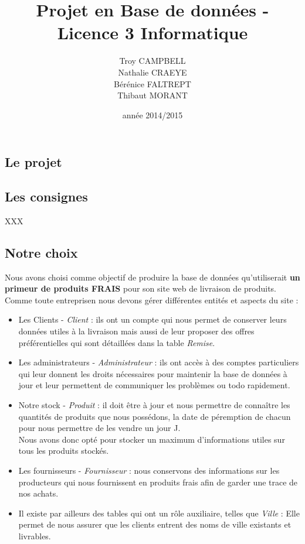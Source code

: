 \documentclass[a4paper, 12pt]{report}
\title{Projet en Base de données - Licence 3 Informatique}
\author{Troy CAMPBELL \\ Nathalie CRAEYE \\ Bérénice FALTREPT \\ Thibaut MORANT}
\date{année 2014/2015}
\begin{document}
    \begin{spacing}{1.2}
\maketitle %


\newpage
\textcolor{colortitre1}{\section*{Le projet}} 

\textcolor{colortitre2}{\subsection*{Les consignes}} 
XXX

\textcolor{colortitre2}{\subsection*{Notre choix}} 
Nous avons choisi comme objectif de produire la base de données qu'utiliserait \textbf{un primeur de produits FRAIS} pour son site web de livraison de produits. Comme toute entreprisen nous devons gérer différentes entités et aspects du site : 
\begin{itemize}
	\item Les Clients - \textit{Client} : ils ont un compte qui nous permet de conserver leurs données utiles à la livraison mais aussi de leur proposer des offres préférentielles qui sont détaillées dans la table \textit{Remise}. 
	\item Les administrateurs  - \textit{Administrateur} : ils ont accès à des comptes particuliers qui leur donnent les droits nécessaires pour maintenir la base de données à jour et leur permettent de communiquer les problèmes ou todo rapidement.
	\item Notre stock - \textit{Produit} : il doit être à jour et nous permettre de connaître les quantités de produits que nous possédons, la date de péremption de chacun pour nous permettre de les vendre un jour J. \\ Nous avons donc opté pour stocker un maximum d'informations utiles sur tous les  produits stockés.
	\item Les fournisseurs - \textit{Fournisseur} : nous conservons des informations sur les producteurs qui nous fournissent en produits frais afin de garder une trace de nos achats.
	\item Il existe par ailleurs des tables qui ont un rôle auxiliaire, telles que \textit{Ville} : Elle permet de nous assurer que les clients entrent des noms de ville existants et livrables.
\end{itemize}




\end{spacing}
\end{document}
